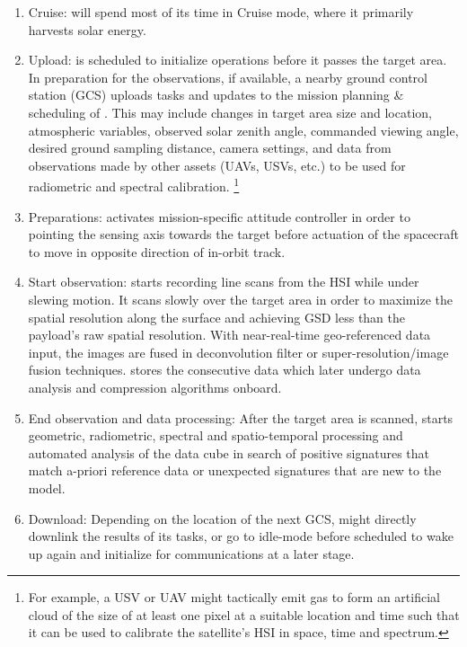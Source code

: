 \begin{enumerate}

\item Cruise: \hypso will spend most of its time in Cruise
  mode, where it primarily harvests solar energy.

\item Upload: \hypso is scheduled to initialize operations before
  it passes the target area. In preparation for the observations, 
	if available, a nearby ground control station (GCS) uploads tasks and updates to the mission planning \& scheduling of \hypso. This may include changes in target area size and location, atmospheric variables, observed solar zenith angle, commanded viewing angle, desired ground sampling distance, camera settings, and data from observations made by other assets
  (UAVs, USVs, etc.) to be used for radiometric and spectral calibration. \footnote{For example, a USV or UAV
    might tactically emit gas to form an artificial cloud of the size
    of at least one pixel at a suitable location and time such that it
    can be used to calibrate the satellite's HSI in space, time and
    spectrum.}

\item Preparations: \hypso activates mission-specific attitude controller in order to pointing the sensing axis towards the target before actuation of the spacecraft to move in opposite direction of in-orbit track.

\item Start observation: \hypso starts recording line scans from
  the HSI while under slewing
  motion. It scans slowly over the target area in order to
  maximize the spatial resolution along the surface and achieving GSD less than the payload's raw spatial resolution. With near-real-time geo-referenced data input, the images are fused in deconvolution filter or super-resolution/image fusion techniques.  \hypso stores the consecutive data which later undergo 
	data analysis and compression algorithms onboard.

\item End observation and data processing: After the target area is
  scanned, \hypso starts geometric, radiometric, spectral and spatio-temporal processing and
	automated analysis of the data cube in search of positive signatures that match a-priori reference data or unexpected signatures that are new to the model.

\item Download: Depending on the location of the next GCS, \hypso might directly downlink the
  results of its tasks, or go to idle-mode before scheduled to wake up again and initialize for communications at a later stage.


\end{enumerate}
